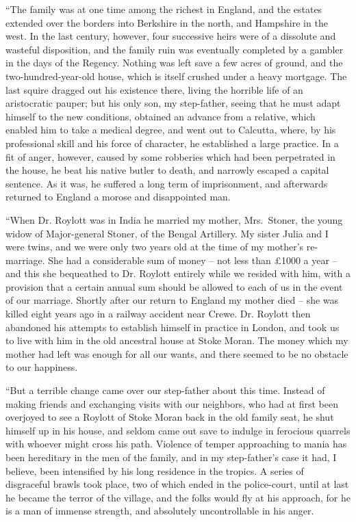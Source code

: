 “The family was at one time among the richest in England,
and the estates extended over the borders into Berkshire in
the north, and Hampshire in the west. In the last century,
however, four successive heirs were of a dissolute and wasteful
disposition, and the family ruin was eventually completed
by a gambler in the days of the Regency. Nothing was left
save a few acres of ground, and the two-hundred-year-old
house, which is itself crushed under a heavy mortgage. The
last squire dragged out his existence there, living the horrible
life of an aristocratic pauper; but his only son, my step-father,
seeing that he must adapt himself to the new conditions, obtained
an advance from a relative, which enabled him to take
a medical degree, and went out to Calcutta, where, by his
professional skill and his force of character, he established a
large practice. In a fit of anger, however, caused by some
robberies which had been perpetrated in the house, he beat
his native butler to death, and narrowly escaped a capital
sentence. As it was, he suffered a long term of imprisonment,
and afterwards returned to England a morose and disappointed
man.

“When Dr. Roylott was in India he married my mother,
Mrs.~Stoner, the young widow of Major-general Stoner, of the
Bengal Artillery. My sister Julia and I were twins, and we
were only two years old at the time of my mother’s re-marriage.
She had a considerable sum of money -- not less than
£1000 a year -- and this she bequeathed to Dr. Roylott
entirely while we resided with him, with a provision that a
certain annual sum should be allowed to each of us in the
event of our marriage. Shortly after our return to England
my mother died -- she was killed eight years ago in a railway
accident near Crewe. Dr. Roylott then abandoned his attempts
to establish himself in practice in London, and took
us to live with him in the old ancestral house at Stoke Moran.
The money which my mother had left was enough for all our
wants, and there seemed to be no obstacle to our happiness.

“But a terrible change came over our step-father about this
time. Instead of making friends and exchanging visits with our
neighbors, who had at first been overjoyed to see a Roylott of
Stoke Moran back in the old family seat, he shut himself up
in his house, and seldom came out save to indulge in ferocious
quarrels with whoever might cross his path. Violence of
temper approaching to mania has been hereditary in the men of
the family, and in my step-father’s case it had, I believe, been
intensified by his long residence in the tropics. A series of
disgraceful brawls took place, two of which ended in the
police-court, until at last he became the terror of the village,
and the folks would fly at his approach, for he is a man of immense
strength, and absolutely uncontrollable in his anger.

